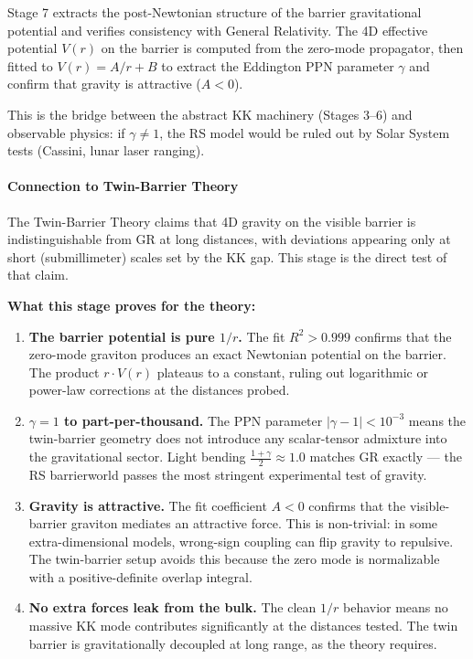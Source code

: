 \documentclass[
  11pt,
]{article}
\begin{document}
Stage 7 extracts the post-Newtonian structure of the barrier
gravitational potential and verifies consistency with General
Relativity. The 4D effective potential \(V(r)\) on the barrier is
computed from the zero-mode propagator, then fitted to
\(V(r) = A/r + B\) to extract the Eddington PPN parameter \(\gamma\) and
confirm that gravity is attractive (\(A < 0\)).

This is the bridge between the abstract KK machinery (Stages 3--6) and
observable physics: if \(\gamma \neq 1\), the RS model would be ruled
out by Solar System tests (Cassini, lunar laser ranging).

\bigskip

\hypertarget{connection-to-twin-barrier-theory-6}{%
\paragraph{Connection to Twin-Barrier
Theory}\label{connection-to-twin-barrier-theory-6}}

The Twin-Barrier Theory claims that 4D gravity on the visible barrier is
indistinguishable from GR at long distances, with deviations appearing
only at short (submillimeter) scales set by the KK gap. This stage is
the direct test of that claim.

\textbf{What this stage proves for the theory:}

\begin{enumerate}
\def\labelenumi{\arabic{enumi}.}
\item
  \textbf{The barrier potential is pure \(1/r\).} The fit
  \(R^2 > 0.999\) confirms that the zero-mode graviton produces an exact
  Newtonian potential on the barrier. The product \(r \cdot V(r)\)
  plateaus to a constant, ruling out logarithmic or power-law
  corrections at the distances probed.
\item
  \textbf{\(\gamma = 1\) to part-per-thousand.} The PPN parameter
  \(|\gamma - 1| < 10^{-3}\) means the twin-barrier geometry does not
  introduce any scalar-tensor admixture into the gravitational sector.
  Light bending \(\frac{1+\gamma}{2} \approx 1.0\) matches GR exactly
  --- the RS barrierworld passes the most stringent experimental test of
  gravity.
\item
  \textbf{Gravity is attractive.} The fit coefficient \(A < 0\) confirms
  that the visible-barrier graviton mediates an attractive force. This
  is non-trivial: in some extra-dimensional models, wrong-sign coupling
  can flip gravity to repulsive. The twin-barrier setup avoids this
  because the zero mode is normalizable with a positive-definite overlap
  integral.
\item
  \textbf{No extra forces leak from the bulk.} The clean \(1/r\)
  behavior means no massive KK mode contributes significantly at the
  distances tested. The twin barrier is gravitationally decoupled at
  long range, as the theory requires.
\end{enumerate}
\end{document}
